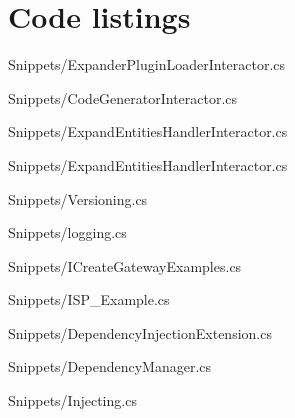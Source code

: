 \chapter{Code listings} \label{appendix_code_listings} 

 
{Snippets/ExpanderPluginLoaderInteractor.cs}

 
{Snippets/CodeGeneratorInteractor.cs}

 
{Snippets/ExpandEntitiesHandlerInteractor.cs}


{Snippets/ExpandEntitiesHandlerInteractor.cs}

 
{Snippets/Versioning.cs}

 
{Snippets/logging.cs}

 
{Snippets/ICreateGatewayExamples.cs}


{Snippets/ISP_Example.cs}


{Snippets/DependencyInjectionExtension.cs}


{Snippets/DependencyManager.cs}


{Snippets/Injecting.cs}

